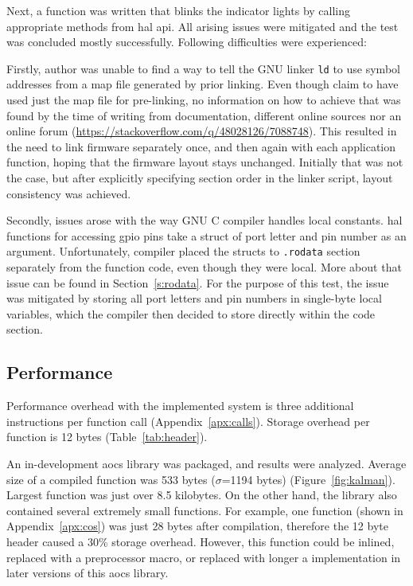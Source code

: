 Next, a function was written that blinks the indicator lights by calling appropriate methods from \gls{hal} \gls{api}. All arising issues were mitigated and the test was concluded mostly successfully. Following difficulties were experienced:

Firstly, author was unable to find a way to tell the GNU linker \texttt{ld} to use symbol addresses from a map file generated by prior linking. Even though \textcite{Dunkels2006} claim to have used just the map file for pre-linking, no information on how to achieve that was found by the time of writing from documentation, different online sources nor an online forum (\url{https://stackoverflow.com/q/48028126/7088748}). This resulted in the need to link firmware separately once, and then again with each application function, hoping that the firmware layout stays unchanged. Initially that was not the case, but after explicitly specifying section order in the linker script, layout consistency was achieved.

Secondly, issues arose with the way GNU C compiler handles local constants. \Gls{hal} functions for accessing \gls{gpio} pins take a struct of port letter and pin number as an argument. Unfortunately, compiler placed the structs to \texttt{.rodata} section separately from the function code, even though they were local. More about that issue can be found in Section~\ref{s:rodata}. For the purpose of this test, the issue was mitigated by storing all port letters and pin numbers in single-byte local variables, which the compiler then decided to store directly within the code section.

\subsection{Performance}

Performance overhead with the implemented system is three additional instructions per function call (Appendix~\ref{apx:calls}). Storage overhead per function is 12 bytes (Table~\ref{tab:header}).

An in-development \gls{aocs} library was packaged, and results were analyzed. Average size of a compiled function was 533 bytes ($\sigma$=1194 bytes) (Figure~\ref{fig:kalman}). Largest function was just over 8.5 kilobytes. On the other hand, the library also contained several extremely small functions. For example, one function (shown in Appendix~\ref{apx:cos}) was just 28 bytes after compilation, therefore the 12 byte header caused a 30\% storage overhead. However, this function could be inlined, replaced with a preprocessor macro, or replaced with longer a implementation in later versions of this \gls{aocs} library.

